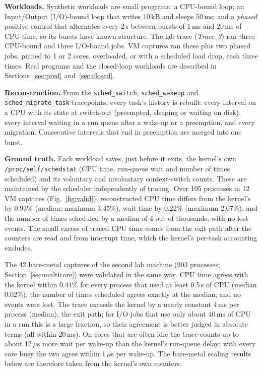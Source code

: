 \documentclass[conference,onecolumn,11pt]{IEEEtran}
\begin{document}
\textbf{Workloads.} Synthetic workloads are small programs: a CPU-bound loop; an Input/Output (I/O)-bound loop that writes 10\,kB and sleeps 50\,ms; and a \emph{phased} positive control that alternates every 2\,s between bursts of 1\,ms and 20\,ms of CPU time, so its bursts have known structure. The lab trace (\emph{Trace~3}) ran three CPU-bound and three I/O-bound jobs. VM captures ran these plus two phased jobs, pinned to 1 or 2 cores, overloaded, or with a scheduled load drop, each three times. Real programs and the closed-loop workloads are described in Sections~\ref{sec:pred} and~\ref{sec:closed}.

\textbf{Reconstruction.} From the \texttt{sched\_switch}, \texttt{sched\_wakeup} and \texttt{sched\_migrate\_task} tracepoints, every task's history is rebuilt: every interval on a CPU with its state at switch-out (preempted, sleeping or waiting on disk), every interval waiting in a run queue after a wake-up or a preemption, and every migration. Consecutive intervals that end in preemption are merged into one burst.

\textbf{Ground truth.} Each workload saves, just before it exits, the kernel's own \texttt{/proc/self/schedstat} (CPU time, run-queue wait and number of times scheduled) and its voluntary and involuntary context-switch counts. These are maintained by the scheduler independently of tracing. Over 105 processes in 12 VM captures (Fig.~\ref{fig:valid}), reconstructed CPU time differs from the kernel's by 0.93\% (median; maximum 3.45\%), wait time by 0.22\% (maximum 2.07\%), and the number of times scheduled by a median of 4 out of thousands, with no lost events. The small excess of traced CPU time comes from the exit path after the counters are read and from interrupt time, which the kernel's per-task accounting excludes.

The 42 bare-metal captures of the second lab machine (903 processes; Section~\ref{sec:multicore}) were validated in the same way. CPU time agrees with the kernel within 0.44\% for every process that used at least 0.5\,s of CPU (median 0.02\%), the number of times scheduled agrees exactly at the median, and no events were lost. The trace exceeds the kernel by a nearly constant 4\,ms per process (median), the exit path; for I/O jobs that use only about 40\,ms of CPU in a run this is a large fraction, so their agreement is better judged in absolute terms (all within 20\,ms). On cores that are often idle the trace counts up to about 12\,$\mu$s more wait per wake-up than the kernel's run-queue delay; with every core busy the two agree within 1\,$\mu$s per wake-up. The bare-metal scaling results below are therefore taken from the kernel's own counters.
\end{document}

